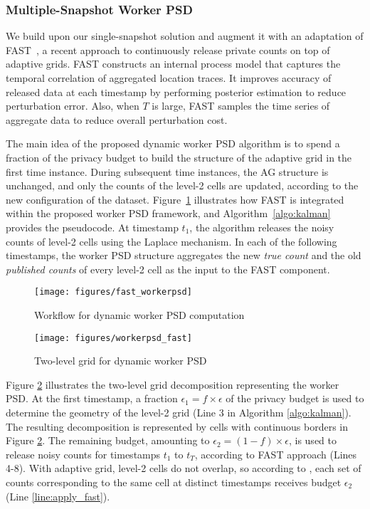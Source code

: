 \documentclass{USC-Thesis}
\numberwithin{equation}{chapter}
\begin{document}
\subsubsection{Multiple-Snapshot Worker PSD}

We build upon our single-snapshot solution and augment it with an adaptation of FAST~\cite{Fan14TKDE}, a recent approach to continuously release private counts on top of adaptive grids. 
FAST constructs an internal process model that captures the temporal correlation of aggregated location traces. It improves accuracy of released data at each timestamp by performing posterior estimation to reduce perturbation error.  Also, when $T$ is large, FAST samples the time series of aggregate data to reduce overall perturbation cost.

The main idea of the proposed dynamic worker PSD algorithm is to spend a fraction of the privacy budget to build the structure of the adaptive grid in the first time instance. During subsequent time instances, the AG structure is unchanged, and only the counts of the level-2 cells are updated, according to the new configuration of the dataset.
Figure~\ref{fig:fast_workerpsd} illustrates how FAST is integrated within the proposed worker PSD framework, and Algorithm~\ref{algo:kalman} provides the pseudocode.
At timestamp $t_1$, the algorithm releases the noisy counts of level-2 cells using the Laplace mechanism. In each of the following timestamps, the worker PSD structure aggregates the new \emph{true count} and the old \emph{published counts} of every level-2 cell as the input to the FAST component.

\begin{figure}[!htb]\centering
  \texttt{[image: figures/fast\_workerpsd]}
  \caption{Workflow for dynamic worker PSD computation}
  \label{fig:fast_workerpsd}
\end{figure}


\begin{figure}[!htb]\centering
  \texttt{[image: figures/workerpsd\_fast]}
  \caption{Two-level grid for dynamic worker PSD}
  \label{fig:workerpsd_fast}
\end{figure}

Figure \ref{fig:workerpsd_fast} illustrates the two-level grid decomposition representing the worker PSD. At the first timestamp, a fraction $\epsilon_1 = f \times \epsilon$ of the privacy budget is used to determine the geometry of the level-2 grid (Line 3 in Algorithm \ref{algo:kalman}). The resulting decomposition is represented by cells with continuous borders in Figure \ref{fig:workerpsd_fast}. The remaining budget, amounting to $\epsilon_2 = (1-f)\times \epsilon$, is used to release noisy counts for timestamps $t_1$ to $t_T$, according to FAST approach (Lines 4-8). With adaptive grid, level-2 cells do not overlap, so according to \cite{cormode2012differentially}, each set of counts corresponding to the same cell at distinct timestamps receives budget $\epsilon_2$ (Line \ref{line:apply_fast}).
\end{document}
